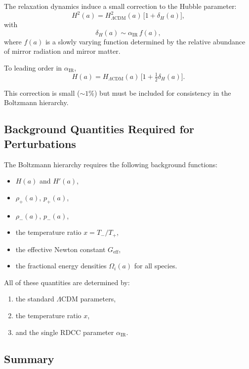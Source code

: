 \documentclass[11pt,a4paper]{article}
\begin{document}
The relaxation dynamics induce a small correction to the Hubble parameter:
\begin{equation}
    H^{2}(a) = H^{2}_{\Lambda\mathrm{CDM}}(a)\,\bigl[1 + \delta_{H}(a)\bigr],
\end{equation}
with
\begin{equation}
    \delta_{H}(a) \sim \alpha_{\mathrm{IR}}\,f(a),
\end{equation}
where $f(a)$ is a slowly varying function determined by the relative abundance of mirror
radiation and mirror matter.

To leading order in $\alpha_{\mathrm{IR}}$,
\begin{equation}
    H(a) = H_{\Lambda\mathrm{CDM}}(a)\,\bigl[1 + \tfrac{1}{2}\delta_{H}(a)\bigr].
\end{equation}

This correction is small ($\sim 1\%$) but must be included for consistency in the Boltzmann
hierarchy.

\subsection{Background Quantities Required for Perturbations}

The Boltzmann hierarchy requires the following background functions:
\begin{itemize}
    \item $H(a)$ and $H'(a)$,
    \item $\rho_{+}(a)$, $p_{+}(a)$,
    \item $\rho_{-}(a)$, $p_{-}(a)$,
    \item the temperature ratio $x = T_{-}/T_{+}$,
    \item the effective Newton constant $G_{\mathrm{eff}}$,
    \item the fractional energy densities $\Omega_{i}(a)$ for all species.
\end{itemize}

All of these quantities are determined by:
\begin{enumerate}
    \item the standard $\Lambda$CDM parameters,
    \item the temperature ratio $x$,
    \item and the single RDCC parameter $\alpha_{\mathrm{IR}}$.
\end{enumerate}

\subsection{Summary}
\end{document}
